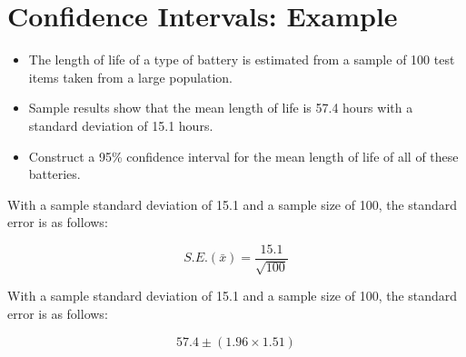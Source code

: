\documentclass[a4paper,12pt]{article}
\begin{document}
\large

\section{Confidence Intervals: Example}

\begin{itemize}
\item The length of life of a type of battery is estimated from a sample of 100 test items taken from a large population. 
\item Sample results show that the mean length of life is 57.4 hours with a standard deviation of 15.1 hours. \\ \bigskip
\item  Construct a 
95\% confidence interval for the mean length of life of all of these batteries.
\end{itemize}






With a sample standard deviation of 15.1 and a sample size of 100, the standard error is as follows:


\[ S.E. (\bar{x}) = \frac{15.1}{\sqrt{100}} \]



With a sample standard deviation of 15.1 and a sample size of 100, the standard error is as follows:


\[ 57.4 \pm \left( 1.96 \times 1.51 \right) \]
\end{document}
